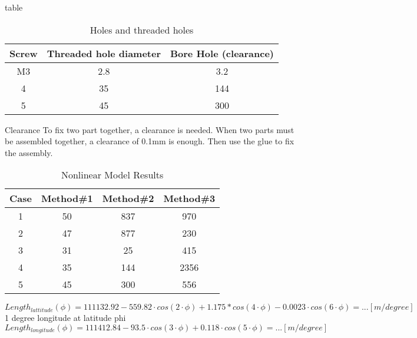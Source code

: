 \documentclass[12pt,a4paper]{article}
\begin{document}
table

\begin{table}[ht]
	\caption{Holes and threaded holes} %
	\centering %
	\begin{tabular}{c c c} %
		\hline\hline %
		Screw & Threaded hole diameter & Bore Hole (clearance) \\ [0.5ex] %
		\hline %
		M3 & 2.8 & 3.2 \\ %
		4 & 35 & 144 \\
		5 & 45 & 300 \\ [1ex] %
		\hline %
	\end{tabular}\label{table:nonlin} %
\end{table}

Clearance
To fix two part together, a clearance is needed.
When two parts must be assembled together, a clearance of 0.1mm is enough. Then use the glue to fix the assembly. 



\begin{table}[ht]
	\caption{Nonlinear Model Results} %
	\centering %
	\begin{tabular}{c c c c} %
		\hline\hline %
		Case & Method\#1 & Method\#2 & Method\#3 \\ [0.5ex] %
		\hline %
		1 & 50 & 837 & 970 \\ %
		2 & 47 & 877 & 230 \\
		3 & 31 & 25 & 415 \\
		4 & 35 & 144 & 2356 \\
		5 & 45 & 300 & 556 \\ [1ex] %
		\hline %
	\end{tabular}\label{table:nonlin} %
\end{table}



\begin{equation}
	Length_{lattitude}(\phi) = 111132.92-559.82 \cdot cos(2 \cdot \phi)+1.175*cos(4 \cdot \phi)-0.0023 \cdot cos(6 \cdot \phi)= ... [m/degree]
\end{equation}
 1 degree longitude at latitude phi
\begin{equation}
	Length_{longitude}(\phi) =
	111412.84-93.5 \cdot cos(3 \cdot \phi)+ 0.118 \cdot cos(5 \cdot \phi)= ... [m/degree]
\end{equation}
\end{document}
